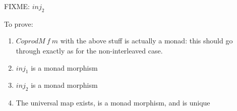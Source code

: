 \documentclass{jfp1}
\newcommand{\eFold}[2]{\llparenthesis #1|#2 \rrparenthesis}
\newcommand{\kw}[1]{\textbf{#1}}
\begin{document}
FIXME: $\mathit{inj}_2$


To prove:
\begin{enumerate}
\item $\mathit{CoprodM}~f~m$ with the above stuff is actually a monad:
  this should go through exactly as for the non-interleaved case.
\item $\mathit{inj}_1$ is a monad morphism
\item $\mathit{inj}_2$ is a monad morphism
\item The universal map exists, is a monad morphism, and is unique
\end{enumerate}



\end{document}
